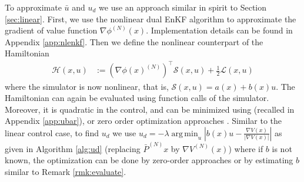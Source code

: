 \documentclass[letterpaper, 10 pt, conference]{ieeeconf}  %
\newcommand{\tp}{^\top}
\renewcommand{\S}{\mathcal{S}}
\newcommand{\ham}{\mathcal{H}}
\newcommand{\half}{\frac{1}{2}}
\DeclareMathOperator*{\argmin}{arg\,min}
\newcommand{\grad}{\nabla}
\renewcommand{\L}{\mathcal{L}}
\begin{document}
To approximate $\bar{u}$ and $u_d$ we use an approach similar in spirit to Section \ref{sec:linear}. First, we use the nonlinear dual EnKF algorithm \cite{joshi-2022} to approximate the gradient of value function $\grad \phi^{(N)}(x)$. Implementation details can be found in Appendix \ref{app:nlenkf}.
Then we define the nonlinear counterpart of the Hamiltonian  
\begin{align} \label{eq:ham-nl}
\ham(x,u) &:= (\grad \phi(x)^{(N)})\tp \S(x,u) + \half\L(x,u)
\end{align}
where the simulator is now nonlinear, that is, $\S(x,u) = a(x) + b(x)u$. The Hamiltonian can again be evaluated using function calls of the simulator. Moreover, it is quadratic in the control, and can be minimized using \cite[Algorithm 2]{joshi-2022} (recalled in Appendix \ref{app:ubar}), or zero order optimization approaches \cite{bach-2016}. Similar to the linear control case, to find $u_d$ we use $u_d = -\lambda \argmin_{u} | b(x)u - \frac{\grad V(x)}{| \grad V(x)|} |$ as given in Algorithm \ref{alg:ud} (replacing $\bar{P}^{(N)}x$ by $\grad V^{(N)}(x)$) where if $b$ is not known, the optimization can be done by zero-order approaches \cite{bach-2016} or by estimating $b$ similar to Remark \ref{rmk:evaluate}.
\end{document}
